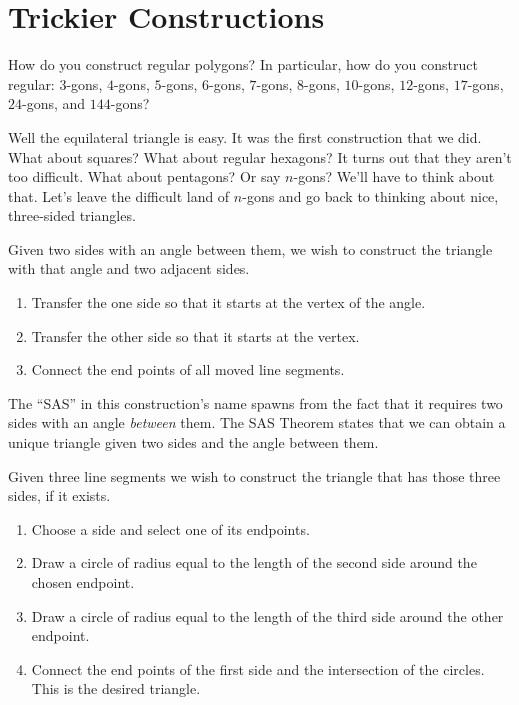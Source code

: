 \newpage

\section{Trickier Constructions}

\begin{question} 
How do you construct regular polygons? In particular, how do you
construct regular: $3$-gons, $4$-gons, $5$-gons, $6$-gons, $7$-gons,
$8$-gons, $10$-gons, $12$-gons, $17$-gons, $24$-gons, and $144$-gons?
\end{question}
\QM

Well the equilateral triangle is easy. It was the first construction
that we did. What about squares? What about regular hexagons? It turns
out that they aren't too difficult. What about pentagons? Or say
$n$-gons? We'll have to think about that. Let's leave the difficult
land of $n$-gons and go back to thinking about nice, three-sided
triangles.

\begin{construction}  
Given two sides with an angle between them, we wish to construct the
triangle with that angle and two adjacent sides.
\begin{enumerate}
\item Transfer the one side so that it starts at the vertex of the
  angle.
\item Transfer the other side so that it starts at the vertex. 
\item Connect the end points of all moved line segments.
\end{enumerate}
\end{construction}

The ``SAS'' in this construction's name spawns from the fact that it
requires two sides with an angle \textit{between} them. The SAS
Theorem states that we can obtain a unique triangle given two sides
and the angle between them.


\begin{construction} 
Given three line segments we wish to construct the triangle that has
those three sides, if it exists.
\begin{enumerate}
\item Choose a side and select one of its endpoints.
\item Draw a circle of radius equal to the length of the second side
  around the chosen endpoint.
\item Draw a circle of radius equal to the length of the third side
  around the other endpoint.
\item Connect the end points of the first side and the intersection of
  the circles. This is the desired triangle.
\end{enumerate}
\end{construction}


